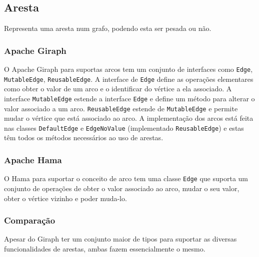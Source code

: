 \newpage
\subsection{Aresta}
Representa uma aresta num grafo, podendo esta ser pesada ou não.
\subsubsection*{Apache Giraph}
O Apache Giraph para suportas arcos tem um conjunto de interfaces como \texttt{Edge}, \texttt{MutableEdge}, \texttt{ReusableEdge}. A interface de \texttt{Edge} define as operações
elementares como obter o valor de um arco e o identificar do vértice a ela associado. A interface \texttt{MutableEdge} estende a interface \texttt{Edge} e define
um método para alterar o valor associado a um arco. \texttt{ReusableEdge} estende de \texttt{MutableEdge} e permite mudar o vértice que está associado ao arco.
A implementação dos arcos está feita nas classes \texttt{DefaultEdge} e \texttt{EdgeNoValue} (implementado \texttt{ReusableEdge}) e estas têm todos os métodos necessários ao uso de arestas.

\subsubsection*{Apache Hama}
O Hama para suportar o conceito de arco tem uma classe \texttt{Edge} que suporta um conjunto de operações de obter o valor associado ao arco, mudar o seu valor,
obter o vértice vizinho e poder muda-lo. 

\subsubsection*{Comparação}
Apesar do Giraph ter um conjunto maior de tipos para suportar as diversas funcionalidades de arestas, ambas fazem essencialmente
o mesmo.